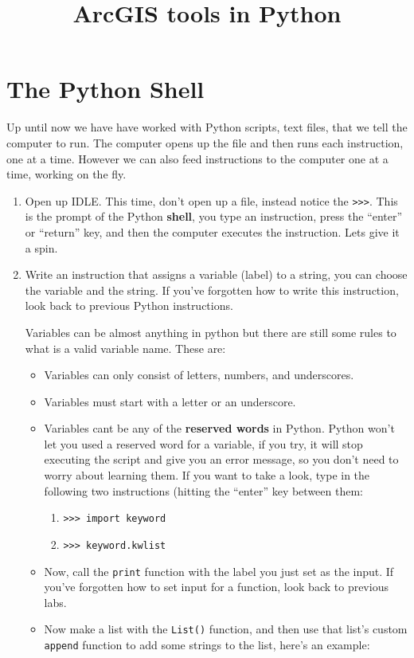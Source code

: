 \documentclass{article}
\begin{document}
\title{ArcGIS tools in Python}
\maketitle

\section{The Python Shell}
Up until now we have have worked with Python scripts, text files, that we tell the computer to run.  The computer opens up the file and then runs each instruction, one at a time.  However we can also feed instructions to the computer one at a time, working on the fly.
\begin{enumerate}
    \item Open up IDLE.  This time, don't open up a file, instead notice the \verb+>>>+.  This is the prompt of the Python \textbf{shell}, you type an instruction, press the ``enter'' or ``return'' key, and then the computer executes the instruction.  Lets give it a spin.
    \item Write an instruction that assigns a variable (label) to a string, you can choose the variable and the string.  If you've forgotten how to write this instruction, look back to previous Python instructions.

    Variables can be almost anything in python but there are still some rules to what is a valid variable name.  These are:
    \begin{itemize}
        \item Variables can only consist of letters, numbers, and underscores.
        \item Variables must start with a letter or an underscore.
        \item Variables cant be any of the \textbf{reserved words} in Python.  
              Python won't let you used a reserved word for a variable, if you try, it will stop executing the script and give you an error message, so you don't need to worry about learning them.  If you want to take a look, type in the following two instructions (hitting the ``enter'' key between them: 
              \begin{enumerate}
                  \item \verb+>>> import keyword+
                  \item \verb+>>> keyword.kwlist+
              \end{enumerate}
    \item Now, call the \verb+print+ function with the label you just set as the input.  If you've forgotten how to set input for a function, look back to previous labs.
    \item Now make a list with the \verb+List()+ function, and then use that list's custom \verb+append+ function to add some strings to the list, here's an example:


\end{itemize}
\end{enumerate}
\end{document}
